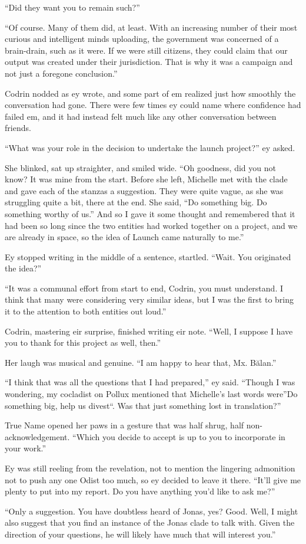 ``Did they want you to remain such?''

``Of course. Many of them did, at least. With an increasing number of their most curious and intelligent minds uploading, the government was concerned of a brain-drain, such as it were. If we were still citizens, they could claim that our output was created under their jurisdiction. That is why it was a campaign and not just a foregone conclusion.''

Codrin nodded as ey wrote, and some part of em realized just how smoothly the conversation had gone. There were few times ey could name where confidence had failed em, and it had instead felt much like any other conversation between friends.

``What was your role in the decision to undertake the launch project?'' ey asked.

She blinked, sat up straighter, and smiled wide. ``Oh goodness, did you not know? It was mine from the start. Before she left, Michelle met with the clade and gave each of the stanzas a suggestion. They were quite vague, as she was struggling quite a bit, there at the end. She said, ``Do something big. Do something worthy of us.'' And so I gave it some thought and remembered that it had been so long since the two entities had worked together on a project, and we are already in space, so the idea of Launch came naturally to me.''

Ey stopped writing in the middle of a sentence, startled. ``Wait. You originated the idea?''

``It was a communal effort from start to end, Codrin, you must understand. I think that many were considering very similar ideas, but I was the first to bring it to the attention to both entities out loud.''

Codrin, mastering eir surprise, finished writing eir note. ``Well, I suppose I have you to thank for this project as well, then.''

Her laugh was musical and genuine. ``I am happy to hear that, Mx. Bălan.''

``I think that was all the questions that I had prepared,'' ey said. ``Though I was wondering, my cocladist on Pollux mentioned that Michelle's last words were''Do something big, help us divest``. Was that just something lost in translation?''

True Name opened her paws in a gesture that was half shrug, half non-acknowledgement. ``Which you decide to accept is up to you to incorporate in your work.''

Ey was still reeling from the revelation, not to mention the lingering admonition not to push any one Odist too much, so ey decided to leave it there. ``It'll give me plenty to put into my report. Do you have anything you'd like to ask me?''

``Only a suggestion. You have doubtless heard of Jonas, yes? Good. Well, I might also suggest that you find an instance of the Jonas clade to talk with. Given the direction of your questions, he will likely have much that will interest you.''
